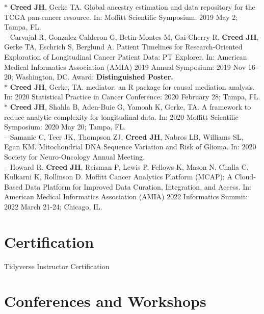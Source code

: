 \documentclass[11pt, a4paper]{article} %
\newcommand{\years}[1]{\marginnote{\scriptsize \raise .3ex\hbox{#1}}} %
\begin{document}
$*$ {\bf Creed JH}, Gerke TA. Global ancestry estimation and data repository for the TCGA pan-cancer resource.  In: Moffitt Scientific Symposium: 2019 May 2; Tampa, FL. \\

-- Carvajal R, Gonzalez-Calderon G, Betin-Montes M, Gai-Cherry R, {\bf Creed JH}, Gerke TA, Eschrich S, Berglund A. Patient Timelines for Research-Oriented Exploration of Longitudinal Cancer Patient Data: PT Explorer. In: American Medical Informatics Association (AMIA) 2019 Annual Symposium: 2019 Nov 16--20; Washington, DC. Award: {\bf Distinguished Poster.}\\

$*$ {\bf Creed JH}, Gerke, TA. mediator: an R package for causal mediation analysis.  In: 2020 Statistical Practice in Cancer Conference: 2020 February 28; Tampa, FL. \\ 

$*$ {\bf Creed JH}, Shahla B, Aden-Buie G, Yamoah K, Gerke, TA. A framework to reduce analytic complexity for longitudinal data.  In: 2020 Moffitt Scientific Symposium: 2020 May 20; Tampa, FL. \\ 

-- Samanic C, Teer JK, Thompson ZJ, {\bf Creed JH}, Nabros LB, Williams SL, Egan KM. Mitochondrial DNA Sequence Variation and Risk of Glioma. In: 2020 Society for Neuro-Oncology Annual Meeting. \\

-- Howard R, {\bf Creed JH}, Reisman P, Lewis P, Fellows K, Mason N, Challa C, Kulkarni K, Rollinson D. Moffitt Cancer Analytics Platform (MCAP): A Cloud-Based Data Platform for Improved Data Curation, Integration, and Access. In: American Medical Informatics Association (AMIA) 2022 Informatics Summit: 2022 March 21-24; Chicago, IL. \\

\section*{Certification}

\years{2020} Tidyverse Instructor Certification 

\section*{Conferences and Workshops}
\end{document}
